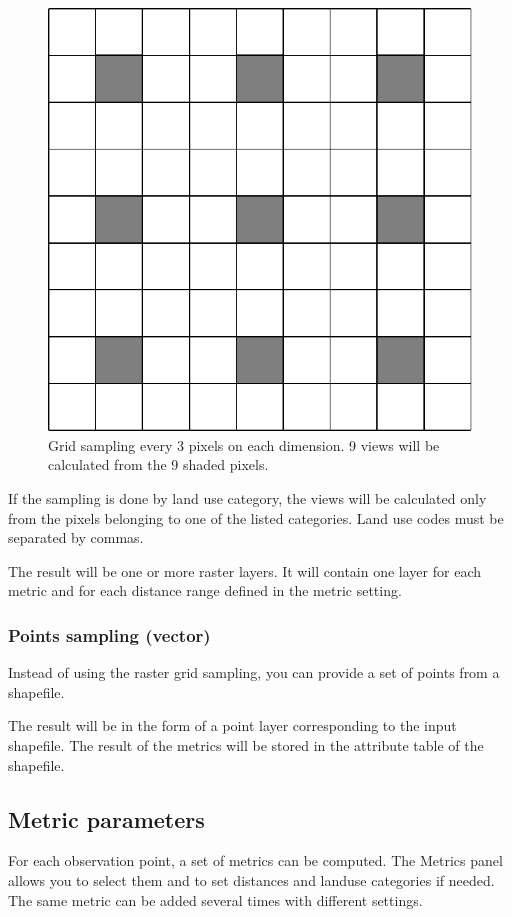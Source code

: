 \documentclass{report}
\begin{document}
\begin{figure}[H]
	\includegraphics[scale=0.5]{img/grid_sampling.pdf} 
	\caption{Grid sampling every 3 pixels on each dimension. 9 views will be calculated from the 9 shaded pixels.}
	\label{grid_sampling}
\end{figure}

If the sampling is done by land use category, the views will be calculated only from the pixels belonging to one of the listed categories. Land use codes must be separated by commas.

The result will be one or more raster layers. It will contain one layer for each metric and for each distance range defined in the metric setting.


\subsubsection{Points sampling (vector)}
Instead of using the raster grid sampling, you can provide a set of points from a shapefile.

The result will be in the form of a point layer corresponding to the input shapefile. The result of the metrics will be stored in the attribute table of the shapefile.


\subsection{Metric parameters}
\label{param_metrics}
For each observation point, a set of metrics can be computed. The Metrics panel allows you to select them and to set distances and landuse categories if needed. The same metric can be added several times with different settings.
\end{document}
